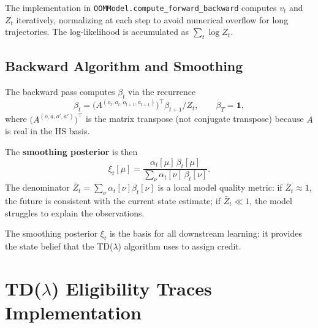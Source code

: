 
The implementation in \verb|OOMModel.compute_forward_backward| computes
$v_t$ and $Z_t$ iteratively, normalizing at each step to avoid numerical
overflow for long trajectories. The log-likelihood is accumulated as
$\sum_t \log Z_t$.


\subsection{Backward Algorithm and Smoothing}

The backward pass computes $\beta_t$ via the recurrence
\begin{equation}
\beta_t = \bigl(A^{(o_t,a_t,o_{t+1},a_{t+1})}\bigr)^\top \beta_{t+1}
           \big/ Z_t,
\qquad \beta_T = \mathbf{1},
\end{equation}
where $\bigl(A^{(o,a,o',a')}\bigr)^\top$ is the matrix transpose
(not conjugate transpose) because $A$ is real in the HS basis.


The \textbf{smoothing posterior} is then
\begin{equation}
\xi_t[\mu] = \frac{\alpha_t[\mu] \, \beta_t[\mu]}
                  {\sum_\nu \alpha_t[\nu] \, \beta_t[\nu]} .
\end{equation}
The denominator $\bar Z_t = \sum_\nu \alpha_t[\nu]\beta_t[\nu]$ is a
local model quality metric: if $\bar Z_t \approx 1$, the future is
consistent with the current state estimate; if $\bar Z_t \ll 1$, the
model struggles to explain the observations.


The smoothing posterior $\xi_t$ is the basis for all downstream learning:
it provides the state belief that the TD($\lambda$) algorithm uses to
assign credit.



\section{TD($\lambda$) Eligibility Traces Implementation}
\label{sec:td_lambda_impl}

